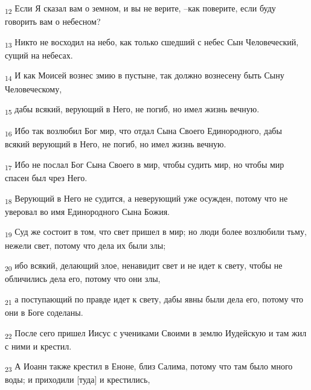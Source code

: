 \begin{tcolorbox}
\textsubscript{12} Если Я сказал вам о земном, и вы не верите, --как поверите, если буду говорить вам о небесном?
\end{tcolorbox}
\begin{tcolorbox}
\textsubscript{13} Никто не восходил на небо, как только сшедший с небес Сын Человеческий, сущий на небесах.
\end{tcolorbox}
\begin{tcolorbox}
\textsubscript{14} И как Моисей вознес змию в пустыне, так должно вознесену быть Сыну Человеческому,
\end{tcolorbox}
\begin{tcolorbox}
\textsubscript{15} дабы всякий, верующий в Него, не погиб, но имел жизнь вечную.
\end{tcolorbox}
\begin{tcolorbox}
\textsubscript{16} Ибо так возлюбил Бог мир, что отдал Сына Своего Единородного, дабы всякий верующий в Него, не погиб, но имел жизнь вечную.
\end{tcolorbox}
\begin{tcolorbox}
\textsubscript{17} Ибо не послал Бог Сына Своего в мир, чтобы судить мир, но чтобы мир спасен был чрез Него.
\end{tcolorbox}
\begin{tcolorbox}
\textsubscript{18} Верующий в Него не судится, а неверующий уже осужден, потому что не уверовал во имя Единородного Сына Божия.
\end{tcolorbox}
\begin{tcolorbox}
\textsubscript{19} Суд же состоит в том, что свет пришел в мир; но люди более возлюбили тьму, нежели свет, потому что дела их были злы;
\end{tcolorbox}
\begin{tcolorbox}
\textsubscript{20} ибо всякий, делающий злое, ненавидит свет и не идет к свету, чтобы не обличились дела его, потому что они злы,
\end{tcolorbox}
\begin{tcolorbox}
\textsubscript{21} а поступающий по правде идет к свету, дабы явны были дела его, потому что они в Боге соделаны.
\end{tcolorbox}
\begin{tcolorbox}
\textsubscript{22} После сего пришел Иисус с учениками Своими в землю Иудейскую и там жил с ними и крестил.
\end{tcolorbox}
\begin{tcolorbox}
\textsubscript{23} А Иоанн также крестил в Еноне, близ Салима, потому что там было много воды; и приходили [туда] и крестились,
\end{tcolorbox}
